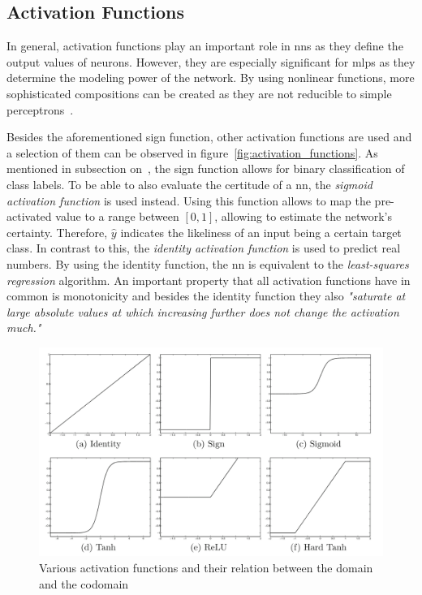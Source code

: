 \documentclass[draft,final]{vutinfth} %
\newcommand{\p}[1]{see p. #1}
\begin{document}
    \subsection{Activation Functions}
    In general, activation functions play an important role in \gls{nn}s as they define the output values of neurons.
    However, they are especially significant for \gls{mlp}s as they determine the modeling power of the network.
    By using nonlinear functions, more sophisticated compositions can be created as they are not reducible to simple perceptrons~\citep{aggarwal_neural_2018}.

    Besides the aforementioned sign function, other activation functions are used and a selection of them can be observed in figure~\eqref{fig:activation_functions}.
    As mentioned in subsection on~, the sign function allows for binary classification of class labels.
    To be able to also evaluate the certitude of a \gls{nn}, the \textit{sigmoid activation function} is used instead.
    Using this function allows to map the pre-activated value to a range between $[0,1]$, allowing to estimate the network's certainty.
    Therefore, $\hat{y}$ indicates the likeliness of an input being a certain target class.
    In contrast to this, the \textit{identity activation function} is used to predict real numbers.
    By using the identity function, the \gls{nn} is equivalent to the \textit{least-squares regression} algorithm.
    An important property that all activation functions have in common is monotonicity and besides the identity function they also \textit{"saturate at large absolute values at which increasing further does not change the activation much."}\citep[\p{13}]{aggarwal_neural_2018}

    \begin{figure}[h]
        \centering
        \includegraphics[width=\textwidth]{figures/various_activation_functions.png}
        \caption[Various activation functions and their relation between the domain and the codomain]{Various activation functions and their relation between the domain and the codomain\protect\footnotemark}
        \label{fig:activation_functions}
    \end{figure}
\end{document}
